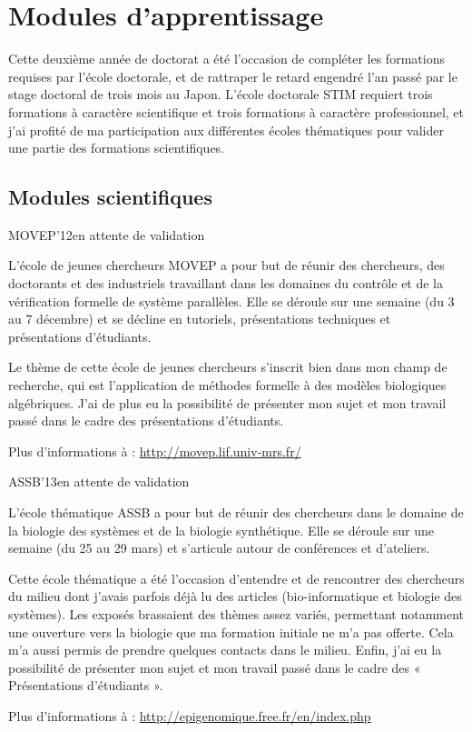 \section{Modules d'apprentissage}

Cette deuxième année de doctorat a été l'occasion de compléter les formations requises par l'école doctorale,
et de rattraper le retard engendré l'an passé par le stage doctoral de trois mois au Japon.
L'école doctorale STIM requiert trois formations à caractère scientifique et trois formations à caractère professionnel,
et j'ai profité de ma participation aux différentes écoles thématiques pour valider une partie des formations scientifiques.

\subsection{Modules scientifiques}

\formation
{MOVEP'12}{en attente de validation}
{L'école de jeunes chercheurs MOVEP a pour but de réunir des chercheurs, des doctorants et des industriels travaillant dans les domaines du contrôle et de la vérification formelle de système parallèles. Elle se déroule sur une semaine (du 3 au 7 décembre) et se décline en tutoriels, présentations techniques et présentations d'étudiants.

Le thème de cette école de jeunes chercheurs s'inscrit bien dans mon champ de recherche, qui est l'application de méthodes formelle à des modèles biologiques algébriques. J'ai de plus eu la possibilité de présenter mon sujet et mon travail passé dans le cadre des présentations d'étudiants.

Plus d'informations à : \url{http://movep.lif.univ-mrs.fr/}}

\formation
{ASSB'13}{en attente de validation}
{L'école thématique ASSB a pour but de réunir des chercheurs dans le domaine de la biologie des systèmes et de la biologie synthétique. Elle se déroule sur une semaine (du 25 au 29 mars) et s'articule autour de conférences et d'ateliers.

Cette école thématique a été l'occasion d'entendre et de rencontrer des chercheurs du milieu dont j'avais parfois déjà lu des articles (bio-informatique et biologie des systèmes). Les exposés brassaient des thèmes assez variés, permettant notamment une ouverture vers la biologie que ma formation initiale ne m'a pas offerte. Cela m'a aussi permis de prendre quelques contacts dans le milieu. Enfin, j'ai eu la possibilité de présenter mon sujet et mon travail passé dans le cadre des « Présentations d'étudiants ».

Plus d'informations à : \url{http://epigenomique.free.fr/en/index.php}}

